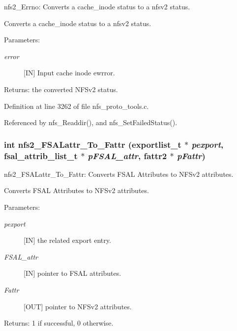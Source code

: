 nfs2\_\-Errno: Converts a cache\_\-inode status to a nfsv2 status.

Converts a cache\_\-inode status to a nfsv2 status.

\begin{Desc}
\item[Parameters:]
\begin{description}
\item[{\em error}][IN] Input cache inode ewrror.\end{description}
\end{Desc}
\begin{Desc}
\item[Returns:]the converted NFSv2 status. \end{Desc}


Definition at line 3262 of file nfs\_\-proto\_\-tools.c.

Referenced by nfs\_\-Readdir(), and nfs\_\-Set\-Failed\-Status().
\subsubsection{\setlength{\rightskip}{0pt plus 5cm}int nfs2\_\-FSALattr\_\-To\_\-Fattr (exportlist\_\-t $\ast$ {\em pexport}, fsal\_\-attrib\_\-list\_\-t $\ast$ {\em p\-FSAL\_\-attr}, fattr2 $\ast$ {\em p\-Fattr})}\label{nfs__proto__tools_8c_a9}


nfs2\_\-FSALattr\_\-To\_\-Fattr: Converts FSAL Attributes to NFSv2 attributes.

Converts FSAL Attributes to NFSv2 attributes.

\begin{Desc}
\item[Parameters:]
\begin{description}
\item[{\em pexport}][IN] the related export entry. \item[{\em FSAL\_\-attr}][IN] pointer to FSAL attributes. \item[{\em Fattr}][OUT] pointer to NFSv2 attributes.\end{description}
\end{Desc}
\begin{Desc}
\item[Returns:]1 if successful, 0 otherwise.\end{Desc}


